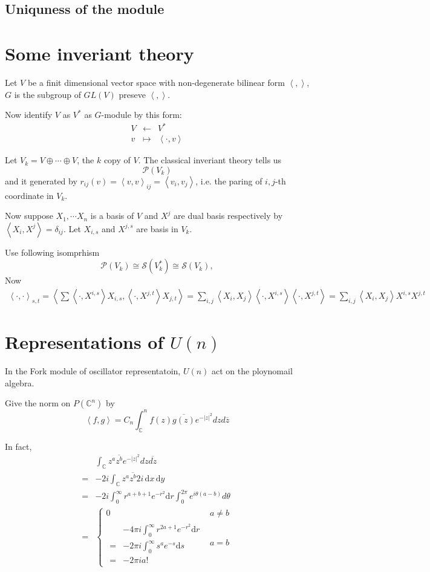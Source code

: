 \documentclass[12pt]{article}
\def\bC{{\mathbb{C}}}
\def\inn#1#2{\left\langle{#1},{#2}\right\rangle}
\def\abs#1{\left|{#1}\right|}
\def\css{\mathcal{S}}
\def\cpp{\mathcal{P}}
\begin{document}
\subsection{Uniquness of  the module}



\appendix
\section{Some inveriant theory}
Let $V$ be a finit dimensional  vector space 
with non-degenerate bilinear form $\inn{}{}$, 
$G$ is the subgroup of $GL(V)$ preseve $\inn{}{}$. 

Now identify $V$ as $V^*$ as $G$-module by this form:
\[
\begin{matrix}
V &\leftarrow& V^*\\
v & \mapsto & \inn{\cdot}{v}
\end{matrix}
\] 

Let $V_k = V\oplus \cdots \oplus V$, the $k$ copy of $V$. 
The classical inveriant theory tells us 
\[
\cpp(V_k) 
\]
and it generated by $r_{ij}(v) = \inn{v}{v}_{ij}= \inn{v_i}{v_j}$,
i.e. the paring of $i,j$-th 
coordinate in $V_k$.

Now suppose $X_1, \cdots X_n$ is a basis of $V$ and 
$X^j$ are dual basis respectively by $\inn{X_i}{X^j} = \delta_{ij}$.
Let $X_{i,s}$ and $X^{j,s}$ are basis in $V_k$. 

Use following isomprhism
\[
\cpp(V_k) \cong \css(V_k^*) \cong \css(V_k),
\]
Now
\[
\begin{split}
\inn{\cdot}{\cdot}_{s,t} = \inn{\sum \inn{\cdot}{X^{i,s}}X_{i,s}}{\inn{\cdot}{X^{j,t}}X_{j,t}} = \sum_{i,j} \inn{X_{i}}{X_{j}}\inn{\cdot}{X^{i,s}}\inn{\cdot}{X^{j,t}}
=\sum_{i,j} \inn{X_i}{X_j} X^{i,s}X^{j,t}
\end{split}
\]

\section{Representations of $U(n)$}
In the Fork module of oscillator representatoin,  
$U(n)$ act on the ploynomail algebra. 


Give the norm on $P(\bC^n)$ by
\[
\inn{f}{g} = C_n\int_\bC^nf(z)\overline{g(z)}e^{-\abs{z}^2}dzd\overline{z}
\]

\def\dd{\mathrm{d}}

In fact, 
\[
\begin{split}
 &\int_\bC z^a \overline{z^b} e^{-\abs{z}^2}dz\overline{dz} \\
=& -2i \int_\bC z^a \overline{z^b} 2i\,\dd x\,\dd y\\
=& -2i\int_{0}^\infty r^{a+b+1}e^{-r^2}\dd r \int_0^{2\pi} e^{i\theta(a-b)}d\theta\\
=& \begin{cases}
0 & a\neq b\\
\begin{split}
 &-4\pi i\int_0^\infty r^{2a+1} e^{-r^2} \dd r \\
=& -2\pi i \int_0^\infty s^a e^{-s}\dd s \\
=& -2\pi i a! 
\end{split}
& a=b 
\end{cases}
\end{split}
\]
\end{document}
